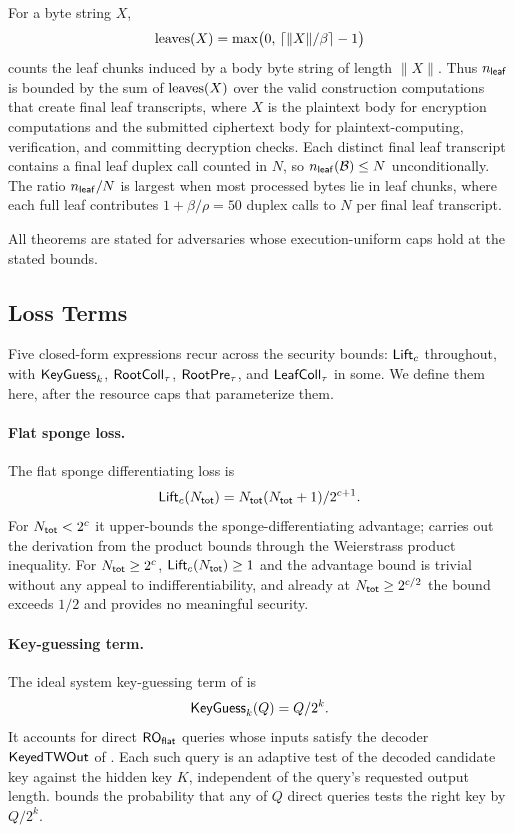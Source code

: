 For a byte string $X$,
\[
  \operatorname{leaves}(X) = \max\bigl(0,\,
    \lceil \|X\| / \beta \rceil - 1\bigr)
\]
counts the leaf chunks induced by a body byte string of length $\|X\|$.
Thus $n_{\mathsf{leaf}}$ is bounded by the sum of $\operatorname{leaves}(X)$ over the valid
construction computations that create final leaf transcripts, where
$X$ is the plaintext body for encryption computations and the submitted
ciphertext body for plaintext-computing, verification, and committing
decryption checks.
Each distinct final leaf transcript contains a final leaf duplex call
counted in $N$, so $n_{\mathsf{leaf}}(\mathcal{B}) \leq N$ unconditionally. The
ratio $n_{\mathsf{leaf}}/N$ is largest when most processed bytes lie in leaf
chunks, where each full leaf contributes $1 + \beta/\rho = 50$ duplex
calls to $N$ per final leaf transcript.

All theorems are stated for adversaries whose execution-uniform caps
hold at the stated bounds.

\subsection{Loss Terms}
\label{sec:loss-terms}

Five closed-form expressions recur across the security bounds: $\mathsf{Lift}_c$
throughout, with $\mathsf{KeyGuess}_k$, $\mathsf{RootColl}_\tau$, $\mathsf{RootPre}_\tau$, and
$\mathsf{LeafColl}_\tau$ in some. We define them here, after the resource caps that
parameterize them.

\paragraph{Flat sponge loss.}
The flat sponge differentiating loss is
\[
  \mathsf{Lift}_c(N_{\mathsf{tot}}) = N_{\mathsf{tot}}(N_{\mathsf{tot}} + 1) / 2^{c + 1}.
\]
For $N_{\mathsf{tot}} < 2^c$ it upper-bounds the \cite{BDPV08} sponge-differentiating
advantage;  carries out the derivation from the
\cite[Lemmas~4 and~5]{BDPV08} product bounds through the Weierstrass
product inequality. For $N_{\mathsf{tot}} \geq 2^c$, $\mathsf{Lift}_c(N_{\mathsf{tot}}) \geq 1$ and the
advantage bound is trivial without any appeal to indifferentiability, and
already at $N_{\mathsf{tot}} \geq 2^{c/2}$ the bound exceeds $1/2$ and provides no
meaningful security.

\paragraph{Key-guessing term.}
The ideal system key-guessing term of \cite{BDPV11} is
\[
  \mathsf{KeyGuess}_k(Q) = Q / 2^k.
\]
It accounts for direct $\mathsf{RO}_{\mathsf{flat}}$ queries whose inputs satisfy the
decoder $\mathsf{KeyedTWOut}$ of . Each such query is an
adaptive test of the decoded candidate key against the hidden key $K$,
independent of the query's requested output length. 
bounds the probability that any of $Q$ direct queries tests the right
key by $Q / 2^k$.

